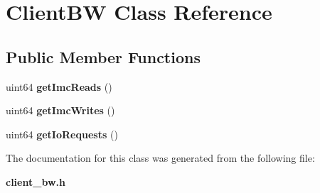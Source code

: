 \section{Client\+BW Class Reference}
\label{classClientBW}
\subsection*{Public Member Functions}
\begin{DoxyCompactItemize}
\item 
uint64 {\bfseries get\+Imc\+Reads} ()\label{classClientBW_adfd4220c06e62c3c3afe94d8388bcfe7}

\item 
uint64 {\bfseries get\+Imc\+Writes} ()\label{classClientBW_ad6ff206335be757c9de8fb732e66d2da}

\item 
uint64 {\bfseries get\+Io\+Requests} ()\label{classClientBW_acf0f1555e987641be5196312b89eb12b}

\end{DoxyCompactItemize}


The documentation for this class was generated from the following file\+:\begin{DoxyCompactItemize}
\item 
{\bf client\+\_\+bw.\+h}\end{DoxyCompactItemize}
